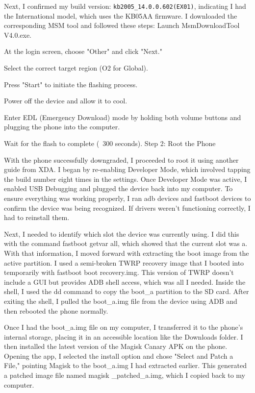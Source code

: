 Next, I confirmed my build version: \texttt{kb2005\_14.0.0.602(EX01)}, indicating I 
had the International model, which uses the KB05AA firmware. I downloaded the corresponding MSM tool and followed these steps:
Launch MsmDownloadTool V4.0.exe.


At the login screen, choose "Other" and click "Next."


Select the correct target region (O2 for Global).


Press "Start" to initiate the flashing process.


Power off the device and allow it to cool.


Enter EDL (Emergency Download) mode by holding both volume buttons and plugging the phone into the computer.


Wait for the flash to complete (~300 seconds).
Step 2: Root the Phone

With the phone successfully downgraded, I proceeded to root it using another guide 
from XDA. I began by re-enabling Developer Mode, which involved tapping the build number eight times in the settings. Once Developer Mode was active, I enabled USB Debugging and plugged the device back into my computer. To ensure everything was working properly, I ran adb devices and fastboot devices to confirm the device was being recognized. If drivers weren’t functioning correctly, I had to reinstall them.

Next, I needed to identify which slot the device was currently using. I did this with the command fastboot getvar all, which showed that the current slot was a. With that information, I moved forward with extracting the boot image from the active partition. I used a semi-broken TWRP recovery image that I booted into temporarily with fastboot boot recovery.img. This version of TWRP doesn’t include a GUI but provides ADB shell access, which was all I needed. Inside the shell, I used the dd command to copy the boot\_a partition to the SD card. After exiting the shell, I pulled the boot\_a.img file from the device using ADB and then rebooted the phone normally.

Once I had the boot\_a.img file on my computer, I transferred it to the phone’s internal storage, placing it in an accessible location like the Downloads folder. I then installed the latest version of the Magisk Canary APK on the phone. Opening the app, I selected the install option and chose "Select and Patch a File," pointing Magisk to the boot\_a.img I had extracted earlier. This generated a patched image file named magisk \_patched\_a.img, which I copied back to my computer.


